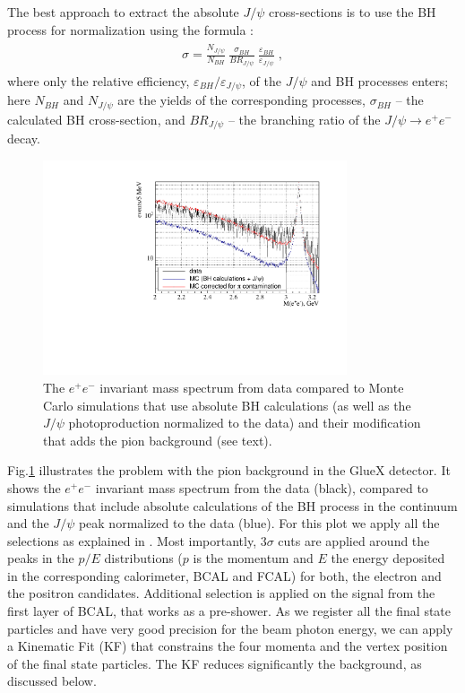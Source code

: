 \documentclass[%
preprint,
nofootinbib,
 amsmath,amssymb,
 aps,
floatfix,
]{revtex4-1}
\begin{document}
The best approach to extract the absolute $J/\psi $ cross-sections is
to use the BH process for normalization using the formula \cite{prl_gluex}:
\begin{eqnarray}
\begin{array}{l}
\sigma = \frac{N_{J/\psi }}{N_{BH}}~\frac{\sigma_{BH}}{BR_{J/\psi}}~ \frac{\varepsilon_{BH}}{\varepsilon_{J/\psi }}\; ,
\label{eq:xsec}
\end{array}
\end{eqnarray}
where only the relative efficiency, $\varepsilon_{BH}/\varepsilon_{J/\psi }$,
of the $J/\psi $ and BH processes enters;
here $N_{BH}$ and $N_{J/\psi }$ are the yields of the corresponding processes,
$\sigma_{BH}$ -- the calculated BH cross-section, and $BR_{J/\psi}$ -- the
branching ratio of the $J/\psi \to e^+e^-$ decay.

\begin{figure}[]
\includegraphics[width=0.80\textwidth]{./fig/GEM_TRD_minv_data_vs_MC.pdf}
  \caption{
The $e^+e^-$ invariant mass spectrum from data compared to 
Monte Carlo simulations that use absolute BH calculations
(as well as the $J/\psi $ photoproduction normalized to the data)
and their modification that adds the pion background (see text).
}
  \label{fig:minv}
\end{figure}
Fig.\ref{fig:minv} illustrates the problem with the pion background
in the GlueX detector.
It shows the $e^+e^-$ invariant mass spectrum from the data (black),
compared to simulations that include absolute calculations of the 
BH process \cite{Berger,Rafo,Jones} in the continuum 
and the $J/\psi $ peak normalized to the data (blue). 
For this plot we apply all the selections as explained in \cite{prl_gluex}.
Most importantly, $3\sigma $ cuts are applied 
around the peaks in the $p/E$ distributions
($p$ is the momentum and $E$ the energy deposited in the corresponding
calorimeter, BCAL and FCAL)
for both, the electron and the positron candidates. 
Additional selection is applied  on the signal from 
the first layer of BCAL, that works as a pre-shower.
As we register all the final state particles and have very good 
precision for the beam photon energy,
we can apply a Kinematic Fit (KF) that constrains the four momenta
and the vertex position of the final state particles.
The KF reduces significantly the background, as discussed below.
\end{document}
